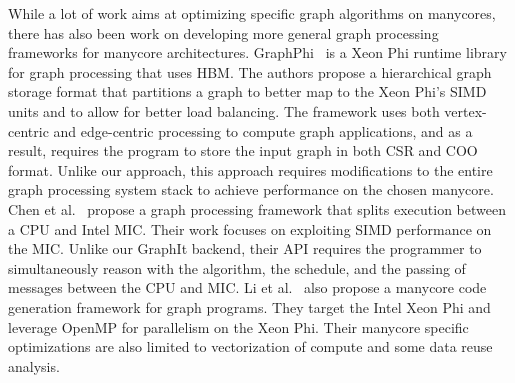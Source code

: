 While a lot of work aims at optimizing specific graph algorithms on manycores, there has also been work on developing more general graph processing frameworks for manycore architectures.
GraphPhi~\cite{peng2018graphphi} is a Xeon Phi runtime library for graph processing that uses HBM. 
The authors propose a hierarchical graph storage format that partitions a graph to better map to the Xeon Phi's SIMD units and to allow for better load balancing.
The framework uses both vertex-centric and edge-centric processing to compute graph applications, and as a result, requires the program to store the input graph in both CSR and COO format.
Unlike our approach, this approach requires modifications to the entire graph processing system stack to achieve performance on the chosen manycore.
Chen et al.~\cite{chen2015efficient} propose a graph processing framework that splits execution between a CPU and Intel MIC. 
Their work focuses on exploiting SIMD performance on the MIC. 
Unlike our GraphIt backend, their API requires the programmer to simultaneously reason with the algorithm, the schedule, and the passing of messages between the CPU and MIC.
Li et al.~\cite{li2014grapid} also propose a manycore code generation framework for graph programs. 
They target the Intel Xeon Phi and leverage OpenMP for parallelism on the Xeon Phi. 
Their manycore specific optimizations are also limited to vectorization of compute and some data reuse analysis.
